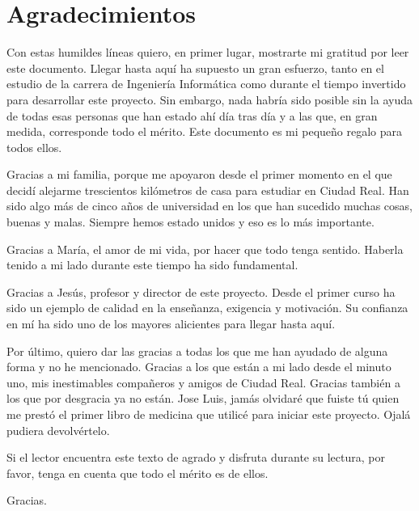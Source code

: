 
\chapter{Agradecimientos}

Con estas humildes líneas quiero, en primer lugar, mostrarte mi gratitud por leer este documento. Llegar hasta aquí ha supuesto un gran esfuerzo, tanto en el estudio de la carrera de Ingeniería Informática como durante el tiempo invertido para desarrollar este proyecto. Sin embargo, nada habría sido posible sin la ayuda de todas esas personas que han estado ahí día tras día y a las que, en gran medida, corresponde todo el mérito. Este documento es mi pequeño regalo para todos ellos.

Gracias a mi familia, porque me apoyaron desde el primer momento en el que decidí alejarme trescientos kilómetros de casa para estudiar en Ciudad Real. Han sido algo más de cinco años de universidad en los que han sucedido muchas cosas, buenas y malas. Siempre hemos estado unidos y eso es lo más importante.

Gracias a María, el amor de mi vida, por hacer que todo tenga sentido. Haberla tenido a mi lado durante este tiempo ha sido fundamental.

Gracias a Jesús, profesor y director de este proyecto. Desde el primer curso ha sido un ejemplo de calidad en la enseñanza, exigencia y motivación. Su confianza en mí ha sido uno de los mayores alicientes para llegar hasta aquí.

Por último, quiero dar las gracias a todas los que me han ayudado de alguna forma y no he mencionado. Gracias a los que están a mi lado desde el minuto uno, mis inestimables compañeros y amigos de Ciudad Real. Gracias también a los que por desgracia ya no están. Jose Luis, jamás olvidaré que fuiste tú quien me prestó el primer libro de medicina que utilicé para iniciar este proyecto. Ojalá pudiera devolvértelo.

Si el lector encuentra este texto de agrado y disfruta durante su lectura, por favor, tenga en cuenta que todo el mérito es de ellos.

Gracias.




